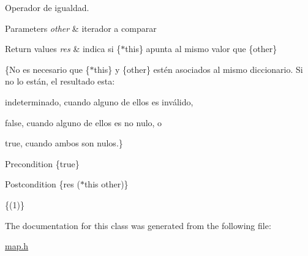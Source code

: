 Operador de igualdad. 


\begin{DoxyParams}{Parameters}
{\em other} & iterador a comparar \\
\hline
\end{DoxyParams}

\begin{DoxyRetVals}{Return values}
{\em res} & indica si \{$\ast$this\} apunta al mismo valor que \{other\}\\
\hline
\end{DoxyRetVals}
\{No es necesario que \{$\ast$this\} y \{other\} estén asociados al mismo diccionario. Si no lo están, el resultado esta\+:
\begin{DoxyItemize}
\item indeterminado, cuando alguno de ellos es inválido,
\item false, cuando alguno de ellos es no nulo, o
\item true, cuando ambos son nulos.\}
\end{DoxyItemize}

\begin{DoxyPrecond}{Precondition}
\{true\} 
\end{DoxyPrecond}
\begin{DoxyPostcond}{Postcondition}
\{res  ($\ast$this  other)\}
\end{DoxyPostcond}
\{(1)\} 

The documentation for this class was generated from the following file\+:\begin{DoxyCompactItemize}
\item 
\hyperlink{map_8h}{map.\+h}\end{DoxyCompactItemize}
